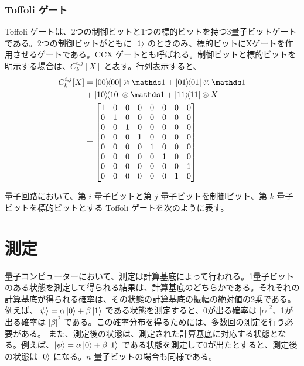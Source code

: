 \subsubsection{Toffoli ゲート}
Toffoli ゲートは、2つの制御ビットと1つの標的ビットを持つ3量子ビットゲートである。2つの制御ビットがともに $\ket{1}$ のときのみ、標的ビットにXゲートを作用させるゲートである。CCX ゲートとも呼ばれる。制御ビットと標的ビットを明示する場合は、$C_k^{i,j}[X]$ と表す。行列表示すると、
\begin{align}
    C_k^{i,j}[X]
    &= \dyad{00}\ot \bbid + \dyad{01}\ot \bbid \nonumber\\
    &+ \dyad{10}\ot \bbid + \dyad{11}\ot X \nonumber\\
    &= \mqty[
        1 & 0 & 0 & 0 & 0 & 0 & 0 & 0 \\
        0 & 1 & 0 & 0 & 0 & 0 & 0 & 0 \\
        0 & 0 & 1 & 0 & 0 & 0 & 0 & 0 \\
        0 & 0 & 0 & 1 & 0 & 0 & 0 & 0 \\
        0 & 0 & 0 & 0 & 1 & 0 & 0 & 0 \\
        0 & 0 & 0 & 0 & 0 & 1 & 0 & 0 \\
        0 & 0 & 0 & 0 & 0 & 0 & 0 & 1 \\
        0 & 0 & 0 & 0 & 0 & 0 & 1 & 0
        ]
\end{align}

量子回路において、第 $i$ 量子ビットと第 $j$ 量子ビットを制御ビット、第 $k$ 量子ビットを標的ビットとする Toffoli ゲートを次のように表す。
\begin{figure}[H]
    \centering
\end{figure}



\section{測定}
量子コンピューターにおいて、測定は計算基底によって行われる。1量子ビットのある状態を測定して得られる結果は、計算基底のどちらかである。それぞれの計算基底が得られる確率は、その状態の計算基底の振幅の絶対値の2乗である。例えば、$\ket{\psi} = \alpha\ket{0} + \beta\ket{1}$ である状態を測定すると、0が出る確率は $|\alpha|^2$、1が出る確率は $|\beta|^2$ である。この確率分布を得るためには、多数回の測定を行う必要がある。
また、測定後の状態は、測定された計算基底に対応する状態となる。例えば、$\ket{\psi} = \alpha\ket{0} + \beta\ket{1}$ である状態を測定して0が出たとすると、測定後の状態は $\ket{0}$ になる。$n$ 量子ビットの場合も同様である。

